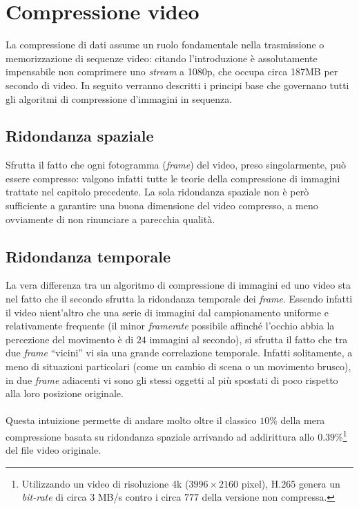 
\section{Compressione video}

La compressione di dati assume un ruolo fondamentale nella trasmissione o 
memorizzazione di sequenze video: citando l'introduzione è assolutamente 
impensabile non comprimere uno \emph{stream} a 1080p, che occupa circa 187MB 
per secondo di video. In seguito verranno descritti i principi base che 
governano tutti gli algoritmi di compressione d'immagini in sequenza.


\subsection{Ridondanza spaziale}

Sfrutta il fatto che ogni fotogramma (\emph{frame}) del video, preso
singolarmente, può essere compresso: valgono infatti tutte le teorie della 
compressione di immagini trattate nel capitolo precedente.
La sola ridondanza spaziale non è però sufficiente a garantire una buona 
dimensione del video compresso, a meno ovviamente di non rinunciare a parecchia 
qualità.


\subsection{Ridondanza temporale}

La vera differenza tra un algoritmo di compressione di immagini ed uno video 
sta nel fatto che il secondo sfrutta la ridondanza temporale dei \emph{frame}. 
Essendo infatti il video nient'altro che una serie di immagini dal  
campionamento uniforme e relativamente frequente (il minor \emph{framerate} 
possibile affinché 
l'occhio abbia la 
percezione del movimento è di $24$ immagini al secondo), si sfrutta il fatto 
che 
tra due \emph{frame} %
 ``vicini'' vi sia una grande correlazione temporale. 
Infatti solitamente, a meno di situazioni particolari (come un cambio di scena 
o un movimento brusco), in due \emph{frame} adiacenti vi sono gli stessi oggetti
al più spostati di poco rispetto alla loro posizione originale.
\\ \\ %
Questa intuizione permette di andare molto oltre il classico $10\%$ della mera 
compressione basata su ridondanza spaziale arrivando ad addirittura allo 
$0.39\%$\footnote{Utilizzando un video di risoluzione 4k ($3996\times2160$ 
pixel), H.265 genera un \emph{bit-rate} di circa $3$ MB/s contro i circa $777$ 
della versione non compressa.} del file video originale. 


